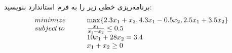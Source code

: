 برنامه‌ریزی خطی زیر را به فرم استاندارد بنویسید:
\[
    \begin{array}{l l}
        minimize            & \hspace*{20pt} \max\{2.3 x_1 + x_2, 4.3 x_1 - 0.5 x_2, 2.5 x_1 + 3.5 x_2\} \\
        subject\,to         & \hspace*{20pt} \frac{x_1}{x_1 + x_2} \leq 0.5 \\
                            & \hspace*{20pt} 10 x_1 + 28 x_2 = 3.4 \\
                            & \hspace*{20pt} x_1 + x_2 \geq 0
    \end{array}
\]